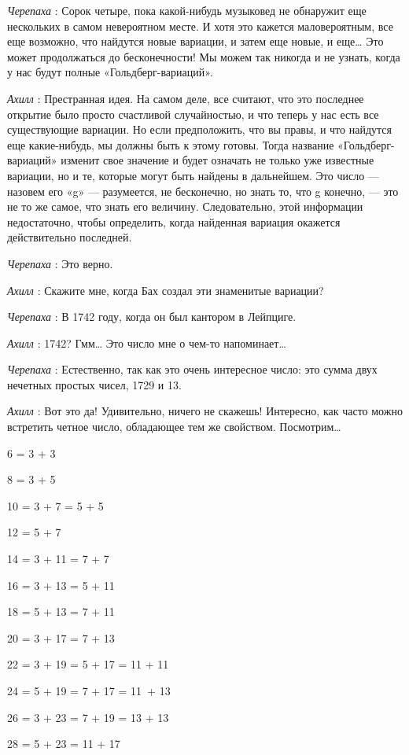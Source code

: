 \emph{Черепаха} : Сорок четыре, пока какой-нибудь музыковед не обнаружит еще нескольких в самом невероятном месте. И хотя это кажется маловероятным, все еще возможно, что найдутся новые вариации, и затем еще новые, и еще\ldots{} Это может продолжаться до бесконечности! Мы можем так никогда и не узнать, когда у нас будут полные «Гольдберг-вариаций».

\emph{Ахилл} : Престранная идея. На самом деле, все считают, что это последнее открытие было просто счастливой случайностью, и что теперь у нас есть все существующие вариации. Но если предположить, что вы правы, и что найдутся еще какие-нибудь, мы должны быть к этому готовы. Тогда название «Гольдберг-вариаций» изменит свое значение и будет означать не только уже известные вариации, но и те, которые могут быть найдены в дальнейшем. Это число --- назовем его «g» --- разумеется, не бесконечно, но знать то, что g конечно, --- это не то же самое, что знать его величину. Следовательно, этой информации недостаточно, чтобы определить, когда найденная вариация окажется действительно последней.

\emph{Черепаха} : Это верно.

\emph{Ахилл} : Скажите мне, когда Бах создал эти знаменитые вариации?

\emph{Черепаха} : В 1742 году, когда он был кантором в Лейпциге.

\emph{Ахилл} : 1742? Гмм\ldots{} Это число мне о чем-то напоминает\ldots{}

\emph{Черепаха} : Естественно, так как это очень интересное число: это сумма двух нечетных простых чисел, 1729 и 13.

\emph{Ахилл} : Вот это да! Удивительно, ничего не скажешь! Интересно, как часто можно встретить четное число, обладающее тем же свойством. Посмотрим\ldots{}

6 = 3 + 3

8 = 3 + 5

10 = 3 + 7 = 5 + 5

12 = 5 + 7

14 = 3 + 11 = 7 + 7

16 = 3 + 13 = 5 + 11

18 = 5 + 13 = 7 + 11

20 = 3 + 17 = 7 + 13

22 = 3 + 19 = 5 + 17 = 11 + 11

24 = 5 + 19 = 7 + 17 = 11~+ 13

26 = 3 + 23 = 7 + 19 = 13 + 13

28 = 5 + 23 = 11 + 17

